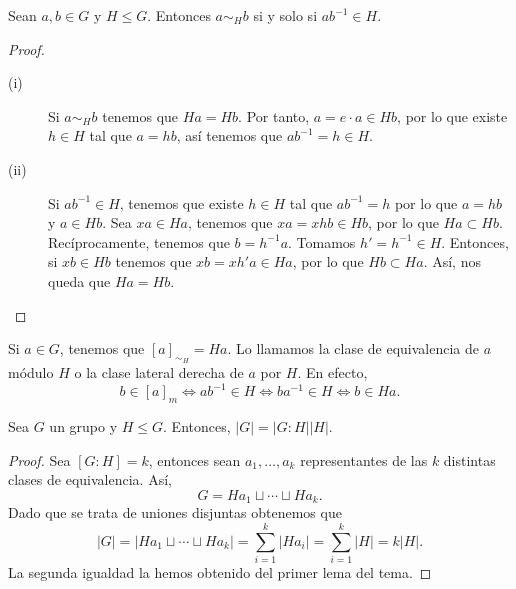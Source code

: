 \begin{lema}
Sean $\displaystyle a,b \in G $ y $\displaystyle H \leq G $. Entonces $\displaystyle a\sim_{H}b $ si y solo si $\displaystyle ab^{-1}\in H $. 
\end{lema}
\begin{proof}
\begin{description}
\item[(i)] Si $\displaystyle a \sim _{H}b $ tenemos que $\displaystyle Ha = Hb $. Por tanto, $\displaystyle a = e \cdot a \in Hb $, por lo que existe $\displaystyle h \in H $ tal que $\displaystyle a = hb $, así tenemos que $\displaystyle ab^{-1} = h \in H $. 
\item[(ii)] Si $\displaystyle ab^{-1} \in H $, tenemos que existe $\displaystyle h \in H $ tal que $\displaystyle ab^{-1} = h $ por lo que $\displaystyle a = hb $ y $\displaystyle a \in Hb $. Sea $\displaystyle xa \in Ha $, tenemos que $\displaystyle xa = xhb \in Hb $, por lo que $\displaystyle Ha \subset Hb $. Recíprocamente, tenemos que $\displaystyle b = h^{-1}a $. Tomamos $\displaystyle h' = h^{-1} \in H $. Entonces, si $\displaystyle xb \in Hb $ tenemos que $\displaystyle xb = xh'a \in Ha $, por lo que $\displaystyle Hb\subset Ha $. Así, nos queda que $\displaystyle Ha = Hb $.
\end{description}
\end{proof}
\begin{observation}
	Si $\displaystyle a \in G $, tenemos que $\displaystyle [a]_{\sim_{H}} = Ha $. Lo llamamos la clase de equivalencia de $\displaystyle a $ módulo $\displaystyle H $ o la clase lateral derecha de $\displaystyle a $ por $\displaystyle H $. En efecto, 
	\[b \in [a]_{m} \iff ab^{-1}\in H  \iff ba^{-1} \in H \iff b \in Ha .\]
\end{observation}
\begin{prop}
Sea $\displaystyle G $ un grupo y $\displaystyle H \leq G $. Entonces, $\displaystyle \left|G\right| = \left|G : H\right| \left|H\right| $.
\end{prop}
\begin{proof}
	Sea $\displaystyle [G : H] = k $, entonces sean $\displaystyle a_{1}, \ldots, a_{k} $ representantes de las $\displaystyle k $ distintas clases de equivalencia. Así, 
	\[G = Ha_{1} \sqcup \cdots \sqcup Ha_{k} .\]
Dado que se trata de uniones disjuntas obtenemos que
\[ \left|G\right| = \left|Ha_{1} \sqcup \cdots \sqcup Ha_{k}\right| = \sum^{k}_{i = 1} \left|Ha_{i}\right|  = \sum^{k}_{i = 1} \left|H\right| = k \left|H\right|.\]
La segunda igualdad la hemos obtenido del primer lema del tema.
\end{proof}
